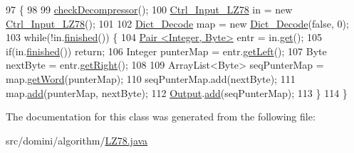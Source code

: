 \begin{DoxyCode}
97                                \{
98 
99         \hyperlink{classdomini_1_1algorithm_1_1Algorithm_a6b738342cc7169893fa60d593f5a13db}{checkDecompressor}();
100         \hyperlink{classpersistencia_1_1input_1_1Ctrl__Input__LZ78}{Ctrl\_Input\_LZ78} in = \textcolor{keyword}{new} \hyperlink{classpersistencia_1_1input_1_1Ctrl__Input__LZ78}{Ctrl\_Input\_LZ78}();
101 
102         \hyperlink{classdomini_1_1utils_1_1Dict__Decode}{Dict\_Decode} map = \textcolor{keyword}{new} \hyperlink{classdomini_1_1utils_1_1Dict__Decode}{Dict\_Decode}(\textcolor{keyword}{false}, 0);
103         \textcolor{keywordflow}{while}(!in.\hyperlink{classpersistencia_1_1input_1_1Ctrl__Input_a5a94d207dce0fd592b5ac17f55154d4f}{finished}()) \{
104             \hyperlink{classdomini_1_1utils_1_1Pair}{Pair <Integer, Byte>} entr = in.\hyperlink{classpersistencia_1_1input_1_1Ctrl__Input__LZ78_ae09535962f284be3a76369845c15b78c}{get}();
105             \textcolor{keywordflow}{if}(in.\hyperlink{classpersistencia_1_1input_1_1Ctrl__Input_a5a94d207dce0fd592b5ac17f55154d4f}{finished}()) \textcolor{keywordflow}{return};
106             Integer punterMap = entr.\hyperlink{classdomini_1_1utils_1_1Pair_a9439fbd8488cb1fbf00c57f15f093c4b}{getLeft}();
107             Byte nextByte = entr.\hyperlink{classdomini_1_1utils_1_1Pair_a0dca94eb1a43952258bebe1dca4c84e9}{getRight}();
108 
109             ArrayList<Byte> seqPunterMap = map.\hyperlink{classdomini_1_1utils_1_1Dict__Decode_a0f6457460aefe9df50f0cad48f58feee}{getWord}(punterMap);
110             seqPunterMap.add(nextByte);
111             map.\hyperlink{classdomini_1_1utils_1_1Dict__Decode_a077011e4507db308d143ea9b7146abb9}{add}(punterMap, nextByte);
112             \hyperlink{classdomini_1_1algorithm_1_1Algorithm_a4de9955411c656325adc391ef570c082}{Output}.\hyperlink{classpersistencia_1_1output_1_1Ctrl__Output_a8c5aa5a6acb5259faeb1c05c71ddd21c}{add}(seqPunterMap);
113         \}
114     \}
\end{DoxyCode}


The documentation for this class was generated from the following file\+:\begin{DoxyCompactItemize}
\item 
src/domini/algorithm/\hyperlink{LZ78_8java}{L\+Z78.\+java}\end{DoxyCompactItemize}
